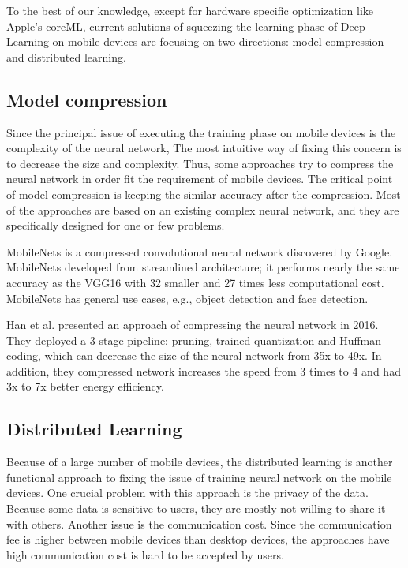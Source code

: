 \documentclass[article]{aaltoseries}
\begin{document}
To the best of our knowledge, except for hardware specific optimization like Apple's coreML\cite{AppleInc.},
 current solutions of squeezing the learning phase of Deep Learning on mobile devices 
are focusing on two directions: model compression and distributed learning.



\subsection{Model compression}


Since the principal issue of executing the training phase on mobile devices is the complexity of the neural network,
The most intuitive way of fixing this concern is to decrease the size and complexity. Thus, some approaches try
to compress the neural network in order fit the requirement of mobile devices.
The critical point of model compression is keeping the similar accuracy after the compression. Most of the approaches
are based on an existing complex neural network, and they are specifically designed for one or few problems. 


MobileNets\cite{MobileNets2017} is a compressed convolutional neural network discovered by Google. MobileNets developed 
from streamlined architecture; it performs nearly the same accuracy as the VGG16\cite{simonyan2014very} with 32 smaller
and 27 times less computational cost. MobileNets has general use cases, e.g., object detection and face detection.

Han et al.\cite{Han2015} presented an approach of compressing the neural network in 2016. 
They deployed a 3 stage pipeline: pruning, trained quantization and Huffman coding, which can decrease
the size of the neural network from 35x to 49x. In addition, they compressed network increases the speed from 3 times to 4
and had 3x to 7x better energy efficiency.

\subsection{Distributed Learning}

Because of a large number of mobile devices, the distributed learning is another functional approach to fixing the
issue of training neural network on the mobile devices.
One crucial problem with this approach is the privacy of the data. Because some data is sensitive to users, 
they are mostly not willing to share it with others. Another issue is the communication cost. Since the communication fee
is higher between mobile devices than desktop devices, the approaches have high communication cost is hard to be 
accepted by users.
\end{document}
